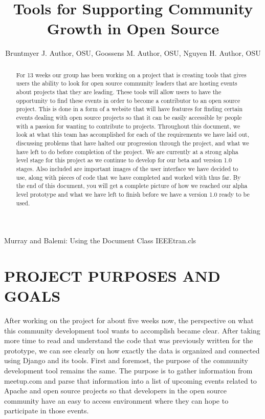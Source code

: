 \documentclass[letterpaper,10pt,onecolumn]{IEEEtran} %
\begin{document}

\title{Tools for Supporting Community Growth in Open Source} %

\author{Bruntmyer J. Author, OSU, Goossens M. Author, OSU, Nguyen H. Author, OSU}

{Murray and Balemi: Using the Document Class IEEEtran.cls} %


\maketitle

\begin{abstract}
For 13 weeks our group has been working on a project that is creating tools that
gives users the ability to look for open source community leaders that are
hosting events about projects that they are leading. These tools will allow
users to have the opportunity to find these events in order to become a
contributor to an open source project. This is done in a form of a website that
will have features for finding certain events dealing with open source projects
so that it can be easily accessible by people with a passion for wanting to
contribute to projects. Throughout this document, we look at what this team has
accomplished for each of the requirements we have laid out, discussing problems
that have halted our progression through the project, and what we have left to
do before completion of the project. We are currently at a strong alpha level
stage for this project as we continue to develop for our beta and version 1.0
stages. Also included are important images of the user interface we have decided
to use, along with pieces of code that we have completed and worked with thus
far. By the end of this document, you will get a complete picture of how we
reached our alpha level prototype and what we have left to finish before we have
a version 1.0 ready to be used.
\end{abstract}

\newpage

\section{PROJECT PURPOSES AND GOALS}
After working on the project for about five weeks now, the perspective on what
this community development tool wants to accomplish became clear. After taking
more time to read and understand the code that was previously written for the
prototype, we can see clearly on how exactly the data is organized and connected
using Django and its tools. First and foremost, the purpose of the community
development tool remains the same. The purpose is to gather information from
meetup.com and parse that information into a list of upcoming events related to
Apache and open source projects so that developers in the open source community
have an easy to access environment where they can hope to participate in those
events.
\end{document}
